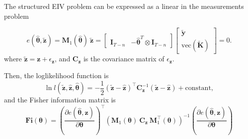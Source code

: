 \documentclass[presentation]{beamer}
\begin{document}
\begin{frame}[label={slide:statistical7_2}]{The structured EIV problem can be expressed as a linear in the measurements problem}

\begin{equation*} e (\widehat{\bm{\theta}}, \widetilde{\mathbf{z}}) = \mathbf{M}_1( \widehat{\bm{\theta}} ) \ \widetilde{\mathbf{z}} = \begin{bmatrix} \mathbf{I}_{T-n} & - \widehat{\bm{\theta}}^T \otimes \mathbf{I}_{T-n} \end{bmatrix} \begin{bmatrix} \widetilde{\mathbf{y}} \\ \mathrm{vec} ( \widetilde{\mathbf{K}} ) \end{bmatrix} = 0 .  \end{equation*}
where $\widetilde{\mathbf{z}} = \mathbf{z} + \epsilon_{\mathbf{z}}$, and $\mathbf{C}_{\mathbf{z}}$ is the covariance matrix of $\epsilon_{\mathbf{z}}$. 

Then, the loglikelihood function is
\begin{equation*} \ln{ l(\widetilde{\mathbf{z}}, \widehat{\mathbf{z}}, \widehat{\bm{\theta}}) } = - \frac{1}{2} \left( \widetilde{\mathbf{z}} - \widehat{\mathbf{z}} \right)^\top \mathbf{C}_{\mathbf{z}}^{-1} \left( \widetilde{\mathbf{z}} - \widehat{\mathbf{z}} \right) + \mathrm{constant}, \end{equation*}
and the Fisher information matrix is
\begin{equation*} \mathbf{Fi}(\bm{\theta}) = \left( \frac{\partial e (\widehat{\bm{\theta}}, \mathbf{z}) }{\partial \bm{\theta} } \right)^\top \left( \mathbf{M}_1( \bm{\theta} ) \ \mathbf{C}_{\mathbf{z}} \ \mathbf{M}_1^\top( \bm{\theta} ) \right)^{-1} \left( \frac{\partial e (\widehat{\bm{\theta}}, \mathbf{z}) }{\partial \bm{\theta} } \right) 
 \end{equation*}
\end{frame}
\end{document}
